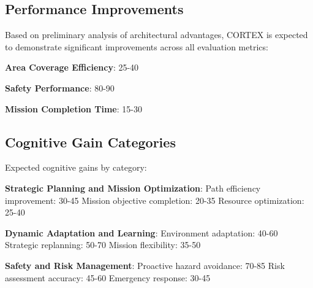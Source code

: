 {\subsection{Performance Improvements}

Based on preliminary analysis of architectural advantages, CORTEX is expected to demonstrate significant improvements across all evaluation metrics:

\textbf{Area Coverage Efficiency}: 25-40%

\textbf{Safety Performance}: 80-90%

\textbf{Mission Completion Time}: 15-30%

\subsection{Cognitive Gain Categories}

Expected cognitive gains by category:

\textbf{Strategic Planning and Mission Optimization}:
Path efficiency improvement: 30-45%
Mission objective completion: 20-35%
Resource optimization: 25-40%

\textbf{Dynamic Adaptation and Learning}:
Environment adaptation: 40-60%
Strategic replanning: 50-70%
Mission flexibility: 35-50%

\textbf{Safety and Risk Management}:
Proactive hazard avoidance: 70-85%
Risk assessment accuracy: 45-60%
Emergency response: 30-45%

}
